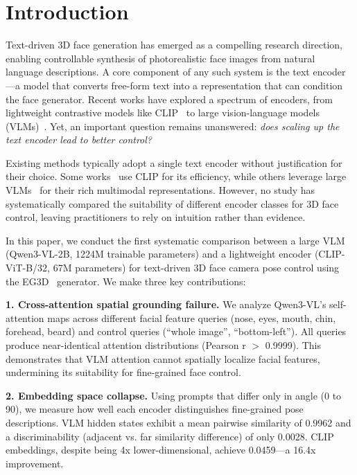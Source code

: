
\section{Introduction}
\label{sec:intro}

Text-driven 3D face generation has emerged as a compelling research direction, enabling controllable synthesis of photorealistic face images from natural language descriptions. A core component of any such system is the text encoder---a model that converts free-form text into a representation that can condition the face generator. Recent works have explored a spectrum of encoders, from lightweight contrastive models like CLIP~\cite{CLIP} to large vision-language models (VLMs)~\cite{Qwen3VL,LLaVA}. Yet, an important question remains unanswered: \emph{does scaling up the text encoder lead to better control?}

Existing methods typically adopt a single text encoder without justification for their choice. Some works~\cite{CLIPFaceGAN,Text2Face} use CLIP for its efficiency, while others leverage large VLMs~\cite{Next3D} for their rich multimodal representations. However, no study has systematically compared the suitability of different encoder classes for 3D face control, leaving practitioners to rely on intuition rather than evidence.

In this paper, we conduct the first systematic comparison between a large VLM (Qwen3-VL-2B, 1224M trainable parameters) and a lightweight encoder (CLIP-ViT-B/32, 67M parameters) for text-driven 3D face camera pose control using the EG3D~\cite{EG3D} generator. We make three key contributions:

\noindent\textbf{1. Cross-attention spatial grounding failure.} We analyze Qwen3-VL's self-attention maps across different facial feature queries (nose, eyes, mouth, chin, forehead, beard) and control queries (``whole image'', ``bottom-left''). All queries produce near-identical attention distributions (Pearson r $>$ 0.9999). This demonstrates that VLM attention cannot spatially localize facial features, undermining its suitability for fine-grained face control.

\noindent\textbf{2. Embedding space collapse.} Using prompts that differ only in angle (0{\textdegree} to 90{\textdegree}), we measure how well each encoder distinguishes fine-grained pose descriptions. VLM hidden states exhibit a mean pairwise similarity of 0.9962 and a discriminability (adjacent vs. far similarity difference) of only 0.0028. CLIP embeddings, despite being 4x lower-dimensional, achieve 0.0459---a 16.4x improvement.


